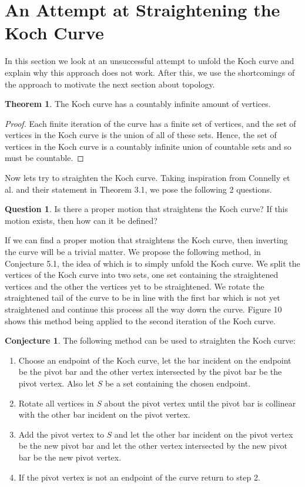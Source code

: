 \documentclass{article}
\theoremstyle{definition}
\newtheorem{question}{Question}[section]
\newtheorem{theorem}{Theorem}[section]
\newtheorem{conjecture}{Conjecture}[section]
\begin{document}
\section{An Attempt at Straightening the Koch Curve}
In this section we look at an unsuccessful attempt to unfold the Koch curve and explain why this approach does not work. After this, we use the shortcomings of the approach to motivate the next section about topology.
\begin{theorem}
    The Koch curve has a countably infinite amount of vertices.
\end{theorem}
\begin{proof}
    Each finite iteration of the curve has a finite set of vertices, and the set of vertices in the Koch curve is the union of all of these sets. Hence, the set of vertices in the Koch curve is a countably infinite union of countable sets and so must be countable.
\end{proof}
\noindent Now lets try to straighten the Koch curve. Taking inspiration from Connelly et al. and their statement in Theorem 3.1, we pose the following 2 questions.
\begin{question}
    Is there a proper motion that straightens the Koch curve? If this motion exists, then how can it be defined?
\end{question}
\noindent If we can find a proper motion that straightens the Koch curve, then inverting the curve will be a trivial matter. We propose the following method, in Conjecture 5.1, the idea of which is to simply unfold the Koch curve. We split the vertices of the Koch curve into two sets, one set containing the straightened vertices and the other the vertices yet to be straightened. We rotate the straightened tail of the curve to be in line with the first bar which is not yet straightened and continue this process all the way down the curve. Figure 10 shows this method being applied to the second iteration of the Koch curve.
\begin{conjecture}
    The following method can be used to straighten the Koch curve:
    \begin{enumerate}
        \item Choose an endpoint of the Koch curve, let the bar incident on the endpoint be the pivot bar and the other vertex intersected by the pivot bar be the pivot vertex. Also let $S$ be a set containing the chosen endpoint.
        \item Rotate all vertices in $S$ about the pivot vertex until the pivot bar is collinear with the other bar incident on the pivot vertex.
        \item Add the pivot vertex to $S$ and let the other bar incident on the pivot vertex be the new pivot bar and let the other vertex intersected by the new pivot bar be the new pivot vertex.
        \item If the pivot vertex is not an endpoint of the curve return to step 2.
    \end{enumerate}
\end{conjecture}
\end{document}
